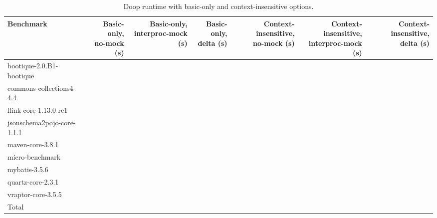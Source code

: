 \begin{table*}
	\centering
	\caption{Doop runtime with basic-only and context-insensitive options.}
	\begin{tabular}{lrrrrrr}
		\toprule
		Benchmark & \thead{Basic-only, \\ no-mock (s)} & \thead{Basic-only, \\ interproc-mock (s)} & \thead{Basic-only, \\ delta (s)} & \thead{Context-insensitive, \\ no-mock (s)}  & \thead{Context-insensitive, \\ interproc-mock (s)} & \thead{Context-insensitive, \\ delta (s)} \\
		\midrule
		bootique-2.0.B1-bootique           		&    &    &   &   &    &     \\
		commons-collections4-4.4           		&    &    &   &   &    &         \\
		flink-core-1.13.0-rc1           		&    &    &   &   &    &         \\
		jsonschema2pojo-core-1.1.1         		&    &    &   &   &    &        \\
		maven-core-3.8.1   		           		&    &    &   &   &    &         \\
		micro-benchmark         		  		&    & 	  &   &   &    &         \\
		mybatis-3.5.6         		  			&    &    &   &   &    &         \\
		quartz-core-2.3.1        	  			&    &    &   &   &    &       \\
		vraptor-core-3.5.5         	  			&    &    &   &   &    &      \\
		\bottomrule
		Total         	  						&    &    &   &   &    &       \\
	\end{tabular}
	\label{tab:doop-runtimes}
\end{table*}

